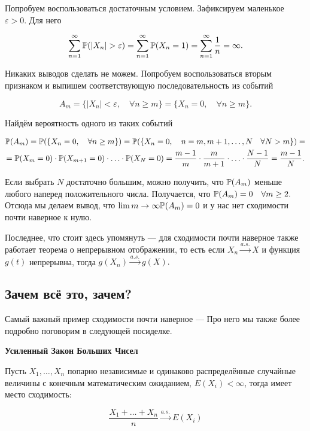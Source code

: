 \documentclass[12pt, a4paper, oneside]{article}
\begin{document}
\begin{sol} 
Попробуем воспользоваться достаточным условием. Зафиксируем маленькое $\varepsilon > 0.$ Для него 

\[
\sum_{n=1}^{\infty} \mathbb{P}(|X_n| > \varepsilon) = \sum_{n=1}^{\infty} \mathbb{P}(X_n = 1) = \sum_{n=1}^{\infty} \frac{1}{n} = \infty.
\]

Никаких выводов сделать не можем. Попробуем воспользоваться вторым признаком и выпишем соответствующую последовательность из событий 

\[
A_m = \{|X_n| < \varepsilon, \quad \forall n \ge m\} = \{X_n = 0, \quad \forall n \ge m\}.
\]

Найдём вероятность одного из таких событий 

\begin{multline*} 
\mathbb{P}(A_m) = \mathbb{P}(\{X_n = 0, \quad \forall n \ge m\}) = \mathbb{P}(\{X_n = 0, \quad n = m, m+1, \ldots, N \quad \forall N > m \}) = \\ = \mathbb{P}(X_m = 0) \cdot \mathbb{P}(X_{m + 1} = 0) \cdot \ldots \cdot \mathbb{P}(X_N  = 0) = \frac{m - 1}{m} \cdot \frac{m}{m + 1} \cdot \ldots \cdot \frac{N - 1}{N} = \frac{m - 1}{N}.
\end{multline*}

Если выбрать $N$ достаточно большим, можно получить, что $\mathbb{P}(A_m)$ меньше любого наперед положительного числа. Получается, что $\mathbb{P}(A_m) = 0 \quad \forall m \ge 2.$ Отсюда мы делаем вывод, что $\lim{m \to \infty} \mathbb{P}(A_m) = 0$ и у нас нет сходимости почти наверное к нулю. 
\end{sol} 

Последнее, что стоит здесь упомянуть --- для сходимости почти наверное также работает теорема о непрерывном отображении, то есть если $X_n \overset{a.s.}{\to} X$ и функция $g(t)$ непрерывна, тогда $g(X_n) \overset{a.s.}{\to} g(X).$

\subsection{Зачем всё это, зачем?}

Самый важный пример сходимости почти наверное ---  Про него мы также более подробно поговорим в следующей посиделке. 

\begin{theorem}{\textbf{Усиленный Закон Больших Чисел}}

Пусть $X_1, \ldots, X_n$ попарно независимые и одинаково распределённые случайные величины с конечным математическим ожиданием, $E(X_i) < \infty$, тогда имеет место сходимость:

$$
\frac{X_1 + \ldots + X_n}{n} \overset{a.s.}{\to} E(X_i)
$$
\end{theorem}
\end{document}
